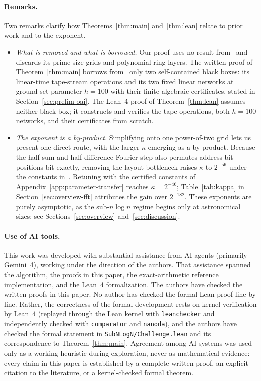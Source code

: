 \paragraph{Remarks.}
Two remarks clarify how Theorems~\ref{thm:main} and~\ref{thm:lean} relate to prior work and to the exponent.
\begin{itemize}[leftmargin=*,itemsep=1.5pt,topsep=2pt]
  \item \emph{What is removed and what is borrowed.}
    Our proof uses no result from~\cite{HvdH21} and discards its prime-size grids and polynomial-ring layers. The written proof of Theorem~\ref{thm:main} borrows from~\cite{OAI26} only two self-contained black boxes: its linear-time tape-stream operations and its two fixed linear networks at ground-set parameter $h=100$ with their finite algebraic certificates, stated in Section~\ref{sec:prelim-oai}. The Lean~4 proof of Theorem~\ref{thm:lean} assumes neither black box; it constructs and verifies the tape operations, both $h=100$ networks, and their certificates from scratch.

  \item \emph{The exponent is a by-product.}
    Simplifying onto one power-of-two grid lets us present one direct route, with the larger $\kappa$ emerging as a by-product. Because the half-sum and half-difference Fourier step also permutes address-bit positions bit-exactly, removing the layout bottleneck raises $\kappa$ to $2^{-56}$ under the constants in~\cite{OAI26}. Retuning with the certified constants of Appendix~\ref{app:parameter-transfer} reaches $\kappa=2^{-46}$; Table~\ref{tab:kappa} in Section~\ref{sec:overview-fft} attributes the gain over $2^{-182}$. These exponents are purely asymptotic, as the sub-$n\log n$ regime begins only at astronomical sizes; see Sections~\ref{sec:overview} and~\ref{sec:discussion}.
\end{itemize}

\paragraph{Use of AI tools.}
This work was developed with substantial assistance from AI agents (primarily Gemini~4), working under the direction of the authors. That assistance spanned the algorithm, the proofs in this paper, the exact-arithmetic reference implementation, and the Lean~4 formalization. The authors have checked the written proofs in this paper. No author has checked the formal Lean proof line by line. Rather, the correctness of the formal development rests on kernel verification by Lean~4 (replayed through the Lean kernel with \texttt{leanchecker} and independently checked with \texttt{comparator} and \texttt{nanoda}), and the authors have checked the formal statement in \texttt{SubNLogN/\allowbreak Challenge.lean} and its correspondence to Theorem~\ref{thm:main}. Agreement among AI systems was used only as a working heuristic during exploration, never as mathematical evidence: every claim in this paper is established by a complete written proof, an explicit citation to the literature, or a kernel-checked formal theorem.

